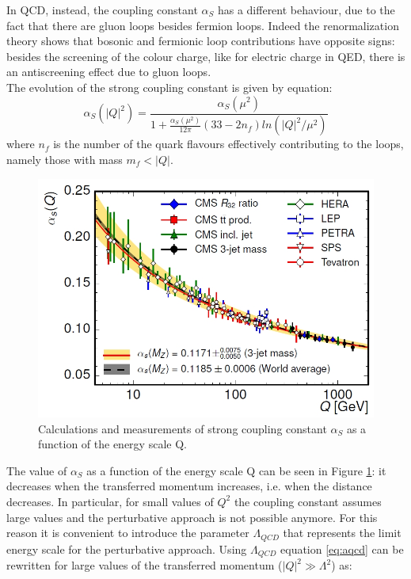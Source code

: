 %
In QCD, instead, the coupling constant $\alpha_{S}$ has a different behaviour, due to the fact that there are gluon loops besides fermion loops. Indeed the renormalization theory shows that bosonic and fermionic loop contributions have opposite signs: besides the screening of the colour charge, like for electric charge in QED, there is an antiscreening effect due to gluon loops.\\
The evolution of the strong coupling constant is given by equation:
%
\begin{equation}
 \alpha_{S}(|Q|^{2})= \frac{ \alpha_{S}(\mu^{2})}{1+\frac{\alpha_{S}(\mu^{2})}{12\pi}(33-2n_{f})ln(|Q|^{2} / \mu^{2})}
 \label{eq:aqcd}
\end{equation}
%
where $n_{f}$ is the number of the quark flavours effectively contributing to the loops, namely those with mass $m_{f} < |Q|$.
%
\begin{figure}
  \centering
  \includegraphics[scale=0.30]{figures/alphas_3j.jpg}
  \caption{Calculations and measurements of strong coupling constant $\alpha_{S}$ as a function of the energy scale Q\cite{kh2015}.}
  \label{fig:alphas}
\end{figure}
%
The value of $\alpha_{S}$ as a function of the energy scale Q can be seen in Figure \ref{fig:alphas}: it decreases when the transferred momentum increases, i.e. when the distance decreases. In particular, for small values of $Q^{2}$ the coupling constant assumes large values and the perturbative approach is not possible anymore.
For this reason it is convenient to introduce the parameter $\Lambda_{QCD}$ that represents the limit energy scale for the perturbative approach. Using $\Lambda_{QCD}$ equation \ref{eq:aqcd} can be rewritten for large values of the transferred momentum ($|Q|^{2} \gg \Lambda^{2}$) as:
